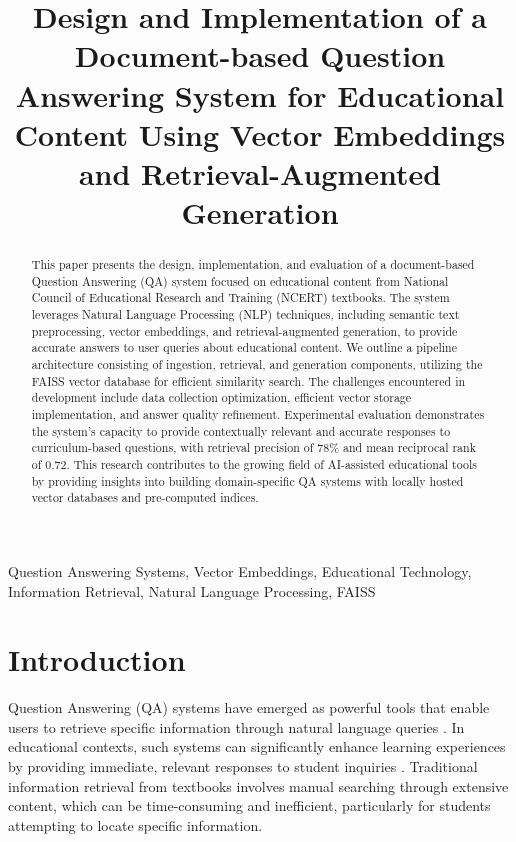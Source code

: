 \documentclass[10pt,conference]{IEEEtran}
\begin{document}
\title{Design and Implementation of a Document-based Question Answering System for Educational Content Using Vector Embeddings and Retrieval-Augmented Generation}

\author{
}

\maketitle

\begin{abstract}
This paper presents the design, implementation, and evaluation of a document-based Question Answering (QA) system focused on educational content from National Council of Educational Research and Training (NCERT) textbooks. The system leverages Natural Language Processing (NLP) techniques, including semantic text preprocessing, vector embeddings, and retrieval-augmented generation, to provide accurate answers to user queries about educational content. We outline a pipeline architecture consisting of ingestion, retrieval, and generation components, utilizing the FAISS vector database for efficient similarity search. The challenges encountered in development include data collection optimization, efficient vector storage implementation, and answer quality refinement. Experimental evaluation demonstrates the system's capacity to provide contextually relevant and accurate responses to curriculum-based questions, with retrieval precision of 78\% and mean reciprocal rank of 0.72. This research contributes to the growing field of AI-assisted educational tools by providing insights into building domain-specific QA systems with locally hosted vector databases and pre-computed indices.
\end{abstract}

\begin{IEEEkeywords}
Question Answering Systems, Vector Embeddings, Educational Technology, Information Retrieval, Natural Language Processing, FAISS
\end{IEEEkeywords}

\section{Introduction}
Question Answering (QA) systems have emerged as powerful tools that enable users to retrieve specific information through natural language queries \cite{b1}. In educational contexts, such systems can significantly enhance learning experiences by providing immediate, relevant responses to student inquiries \cite{b2}. Traditional information retrieval from textbooks involves manual searching through extensive content, which can be time-consuming and inefficient, particularly for students attempting to locate specific information.
\end{document}
